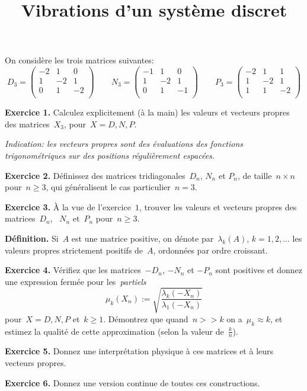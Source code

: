 \title{Vibrations d'un système discret}

On considère les trois matrices suivantes:
\[
	D_3=\begin{pmatrix}
		-2 & 1 & 0 \\
		1 & -2 & 1 \\
		0 & 1 & -2 \\
	\end{pmatrix}
	\qquad
	N_3=\begin{pmatrix}
		-1 & 1 & 0 \\
		1 & -2 & 1 \\
		0 & 1 & -1 \\
	\end{pmatrix}
	\qquad
	P_3=\begin{pmatrix}
		-2 & 1 & 1 \\
		1 & -2 & 1 \\
		1 & 1 & -2 \\
	\end{pmatrix}
\]

{\bf Exercice 1.}
Calculez explicitement (à la main) les valeurs et vecteurs propres des
matrices~$X_3$, pour~$X=D,N,P$.

{\sl Indication: les vecteurs propres sont des évaluations des fonctions
trigonométriques sur des positions régulièrement espacées.}

{\bf Exercice 2.}
Définissez des matrices tridiagonales~$D_n$, $N_n$ et $P_n$, de taille~$n\times
n$ pour~$n\ge 3$, qui généralisent le cas particulier~$n=3$.

{\bf Exercice 3.}
À la vue de l'exercice~$1$, trouver les valeurs et vecteurs propres des
matrices~$D_n$, ~$N_n$ et~$P_n$ pour~$n\ge 3$.

{\bf Définition.}
Si~$A$ est une matrice positive, on dénote par~$\lambda_k(A)$, $k=1,2,\ldots$
les valeurs propres strictement positifs de~$A$, ordonnées par ordre croissant.

{\bf Exercice 4.}
Vérifiez que les matrices~$-D_n$, $-N_n$ et $-P_n$ sont positives et donnez une
expression fermée pour les~\emph{partiels}
\[
	\mu_k(X_n) := \sqrt{\frac{\lambda_k(-X_n)}{\lambda_1(-X_n)}}
\]
pour~$X=D,N,P$ et~$k\ge 1$.  Démontrez que quand~$n>>k$ on a~$\mu_k\approx k$,
et estimez la qualité de cette approximation (selon la valeur de~$\tfrac kn$).

{\bf Exercice 5.}
Donnez une interprétation physique à ces matrices et à leurs vecteurs propres.

{\bf Exercice 6.}
Donnez une version continue de toutes ces constructions.


